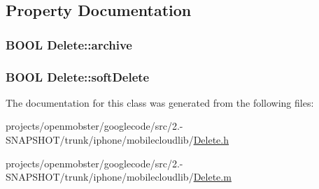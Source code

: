 \subsection{\-Property \-Documentation}
\hypertarget{interface_delete_a8568b55e58d6c99df6c630c446c83d67}{
\subsubsection[{archive}]{\setlength{\rightskip}{0pt plus 5cm}\-B\-O\-O\-L \-Delete\-::archive}}
\label{interface_delete_a8568b55e58d6c99df6c630c446c83d67}
\hypertarget{interface_delete_a9df765a815b8c3118c3a5ee28f1a3213}{
\subsubsection[{soft\-Delete}]{\setlength{\rightskip}{0pt plus 5cm}\-B\-O\-O\-L \-Delete\-::soft\-Delete}}
\label{interface_delete_a9df765a815b8c3118c3a5ee28f1a3213}


\-The documentation for this class was generated from the following files\-:\begin{DoxyCompactItemize}
\item 
projects/openmobster/googlecode/src/2.-\/\-S\-N\-A\-P\-S\-H\-O\-T/trunk/iphone/mobilecloudlib/\hyperlink{_delete_8h}{\-Delete.\-h}\item 
projects/openmobster/googlecode/src/2.-\/\-S\-N\-A\-P\-S\-H\-O\-T/trunk/iphone/mobilecloudlib/\hyperlink{_delete_8m}{\-Delete.\-m}\end{DoxyCompactItemize}
